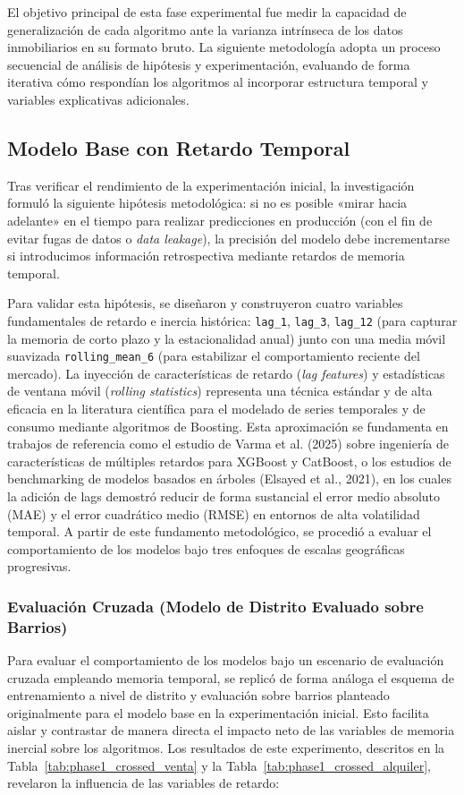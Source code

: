 \documentclass[a4paper,11pt,openany]{book}
\begin{document}
El objetivo principal de esta fase experimental fue medir la capacidad de generalización de cada algoritmo ante la varianza intrínseca de los datos inmobiliarios en su formato bruto. La siguiente metodología adopta un proceso secuencial de análisis de hipótesis y experimentación, evaluando de forma iterativa cómo respondían los algoritmos al incorporar estructura temporal y variables explicativas adicionales.

\subsection{Modelo Base con Retardo Temporal}
Tras verificar el rendimiento de la experimentación inicial, la investigación formuló la siguiente hipótesis metodológica: si no es posible «mirar hacia adelante» en el tiempo para realizar predicciones en producción (con el fin de evitar fugas de datos o \textit{data leakage}), la precisión del modelo debe incrementarse si introducimos información retrospectiva mediante retardos de memoria temporal.

Para validar esta hipótesis, se diseñaron y construyeron cuatro variables fundamentales de retardo e inercia histórica: \texttt{lag\_1}, \texttt{lag\_3}, \texttt{lag\_12} (para capturar la memoria de corto plazo y la estacionalidad anual) junto con una media móvil suavizada \texttt{rolling\_mean\_6} (para estabilizar el comportamiento reciente del mercado). La inyección de características de retardo (\textit{lag features}) y estadísticas de ventana móvil (\textit{rolling statistics}) representa una técnica estándar y de alta eficacia en la literatura científica para el modelado de series temporales y de consumo mediante algoritmos de Boosting. Esta aproximación se fundamenta en trabajos de referencia como el estudio de Varma et al. (2025) sobre ingeniería de características de múltiples retardos para XGBoost y CatBoost, o los estudios de benchmarking de modelos basados en árboles (Elsayed et al., 2021), en los cuales la adición de lags demostró reducir de forma sustancial el error medio absoluto (MAE) y el error cuadrático medio (RMSE) en entornos de alta volatilidad temporal. A partir de este fundamento metodológico, se procedió a evaluar el comportamiento de los modelos bajo tres enfoques de escalas geográficas progresivas.


\subsubsection{Evaluación Cruzada (Modelo de Distrito Evaluado sobre Barrios)}
Para evaluar el comportamiento de los modelos bajo un escenario de evaluación cruzada empleando memoria temporal, se replicó de forma análoga el esquema de entrenamiento a nivel de distrito y evaluación sobre barrios planteado originalmente para el modelo base en la experimentación inicial. Esto facilita aislar y contrastar de manera directa el impacto neto de las variables de memoria inercial sobre los algoritmos. Los resultados de este experimento, descritos en la Tabla~\ref{tab:phase1_crossed_venta} y la Tabla~\ref{tab:phase1_crossed_alquiler}, revelaron la influencia de las variables de retardo:
\end{document}
